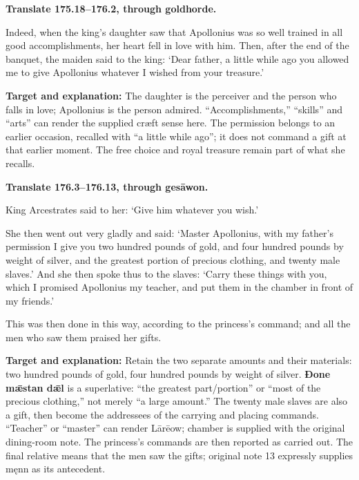 \textbf{Translate 175.18–176.2, through goldhorde.}

Indeed, when the king’s daughter saw that Apollonius was so well trained in all good accomplishments, her heart fell in love with him. Then, after the end of the banquet, the maiden said to the king: ‘Dear father, a little while ago you allowed me to give Apollonius whatever I wished from your treasure.’

\textbf{Target and explanation:} The daughter is the perceiver and the person who falls in love; Apollonius is the person admired. “Accomplishments,” “skills” and “arts” can render the supplied cræft sense here. The permission belongs to an earlier occasion, recalled with “a little while ago”; it does not command a gift at that earlier moment. The free choice and royal treasure remain part of what she recalls.

\textbf{Translate 176.3–176.13, through gesāwon.}

King Arcestrates said to her: ‘Give him whatever you wish.’

She then went out very gladly and said: ‘Master Apollonius, with my father’s permission I give you two hundred pounds of gold, and four hundred pounds by weight of silver, and the greatest portion of precious clothing, and twenty male slaves.’ And she then spoke thus to the slaves: ‘Carry these things with you, which I promised Apollonius my teacher, and put them in the chamber in front of my friends.’

This was then done in this way, according to the princess’s command; and all the men who saw them praised her gifts.

\textbf{Target and explanation:} Retain the two separate amounts and their materials: two hundred pounds of gold, four hundred pounds by weight of silver. \textbf{Ðone mǣstan dǣl} is a superlative: “the greatest part/\allowbreak{}portion” or “most of the precious clothing,” not merely “a large amount.” The twenty male slaves are also a gift, then become the addressees of the carrying and placing commands. “Teacher” or “master” can render Lārēow; chamber is supplied with the original dining-room note. The princess’s commands are then reported as carried out. The final relative means that the men saw the gifts; original note 13 expressly supplies męnn as its antecedent.

